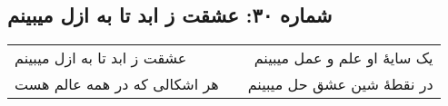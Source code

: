 \begin{center}
\section*{شماره ۳۰: عشقت ز ابد تا به ازل میبینم}
\label{sec:030}
\begin{longtable}{l p{0.5cm} r}
عشقت ز ابد تا به ازل میبینم
&&
یک سایهٔ او علم و عمل میبینم
\\
هر اشکالی که در همه عالم هست
&&
در نقطهٔ شین عشق حل میبینم
\\
\end{longtable}
\end{center}
